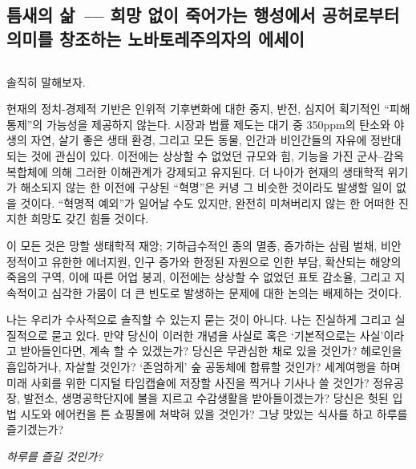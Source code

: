 \documentclass[10pt, b6paper, openany]{memoir}
\title{\booktitle{}}
\author{프리드리히 루럴 루시퍼}
\date{2018}
\newcommand{\booktitle}{틈새의 삶}
\newcommand{\subtitle}{희망 없이 죽어가는 행성에서 공허로부터 의미를 창조하는 노바토레주의자의 에세이}
\newcommand{\fulltitle}{\booktitle{}~--- \subtitle{}}
\begin{document}
\frontmatter
\begin{titlingpage}
\begin{flushleft}
\maketitle
\end{flushleft}
\end{titlingpage}
\tableofcontents

\mainmatter
\begin{article}
\chapter[틈새의 삶]{\fulltitle}
\section{}
솔직히 말해보자. 

현재의 정치-경제적 기반은 인위적 기후변화에 대한 중지, 반전, 심지어 획기적인 ``피해 통제''의 가능성을 제공하지 않는다. 시장과 법률 제도는 대기 중 350ppm의 탄소와 야생의 자연, 살기 좋은 생태 환경, 그리고 모든 동물, 인간과 비인간들의 자유에 정반대되는 것에 관심이 있다. 이전에는 상상할 수 없었던 규모와 힘, 기능을 가진 군사--감옥 복합체에 의해 그러한 이해관계가 강제되고 유지된다. 더 나아가 현재의 생태학적 위기가 해소되지 않는 한 이전에 구상된 ``혁명''은 커녕 그 비슷한 것이라도 발생할 일이 없을 것이다. ``혁명적 예외''가 일어날 수도 있지만, 완전히 미쳐버리지 않는 한 어떠한 진지한 희망도 갖긴 힘들 것이다.

이 모든 것은 망할 생태학적 재앙; 기하급수적인 종의 멸종, 증가하는 삼림 벌채, 비안정적이고 유한한 에너지원, 인구 증가와 한정된 자원으로 인한 부담, 확산되는 해양의 죽음의 구역, 이에 따른 어업 붕괴, 이전에는 상상할 수 없었던 표토 감소율, 그리고 지속적이고 심각한 가뭄이 더 큰 빈도로 발생하는 문제에 대한 논의는 배제하는 것이다. 

나는 우리가 수사적으로 솔직할 수 있는지 묻는 것이 아니다. 나는 진실하게 그리고 실질적으로 묻고 있다. 만약 당신이 이러한 개념을 사실로 혹은 `기본적으로는 사실'이라고 받아들인다면, 계속 할 수 있겠는가? 당신은 무관심한 채로 있을 것인가? 헤로인을 흡입하거나, 자살할 것인가? `존엄하게' 숲 공동체에 합류할 것인가? 세계여행을 하며 미래 사회를 위한 디지털 타임캡슐에 저장할 사진을 찍거나 기사나 쓸 것인가? 정유공장, 발전소, 생명공학단지에 불을 지르고 수감생활을 받아들이겠는가? 당신은 헛된 입법 시도와 에어컨을 튼 쇼핑몰에 쳐박혀 있을 것인가? 그냥 맛있는 식사를 하고 하루를 즐기겠는가?

\emph{하루를 즐길 것인가?}


\end{article}
\end{document}
